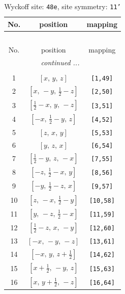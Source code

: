 \documentclass[fleqn,8pt]{jsarticle}
\begin{document}
\renewcommand{\arraystretch}{1.2}
\begin{longtable}{ccc}
\caption{Wyckoff site: {\tt 48e}, site symmetry: {\tt 11'}}
 \\
 \hline \hline
No. & position & mapping \\ \hline \endfirsthead

\multicolumn{2}{l}{\tablename\ \thetable{}} \\
 \hline \hline
No. & position & mapping \\ \hline \endhead

 \hline \hline
\multicolumn{2}{r}{\footnotesize\it continued ...} \\ \endfoot

 \hline \hline
\multicolumn{2}{r}{} \\ \endlastfoot

1 & $\left[ x,\, y,\, z \right]$ & {\tt [1,49]} \\ \hline
2 & $\left[ x,\, - y,\, \frac{1}{2} - z \right]$ & {\tt [2,50]} \\ \hline
3 & $\left[ \frac{1}{2} - x,\, y,\, - z \right]$ & {\tt [3,51]} \\ \hline
4 & $\left[ - x,\, \frac{1}{2} - y,\, z \right]$ & {\tt [4,52]} \\ \hline
5 & $\left[ z,\, x,\, y \right]$ & {\tt [5,53]} \\ \hline
6 & $\left[ y,\, z,\, x \right]$ & {\tt [6,54]} \\ \hline
7 & $\left[ \frac{1}{2} - y,\, z,\, - x \right]$ & {\tt [7,55]} \\ \hline
8 & $\left[ - z,\, \frac{1}{2} - x,\, y \right]$ & {\tt [8,56]} \\ \hline
9 & $\left[ - y,\, \frac{1}{2} - z,\, x \right]$ & {\tt [9,57]} \\ \hline
10 & $\left[ z,\, - x,\, \frac{1}{2} - y \right]$ & {\tt [10,58]} \\ \hline
11 & $\left[ y,\, - z,\, \frac{1}{2} - x \right]$ & {\tt [11,59]} \\ \hline
12 & $\left[ \frac{1}{2} - z,\, x,\, - y \right]$ & {\tt [12,60]} \\ \hline
13 & $\left[ - x,\, - y,\, - z \right]$ & {\tt [13,61]} \\ \hline
14 & $\left[ - x,\, y,\, z + \frac{1}{2} \right]$ & {\tt [14,62]} \\ \hline
15 & $\left[ x + \frac{1}{2},\, - y,\, z \right]$ & {\tt [15,63]} \\ \hline
16 & $\left[ x,\, y + \frac{1}{2},\, - z \right]$ & {\tt [16,64]} \\ \hline

\end{longtable}
\end{document}
